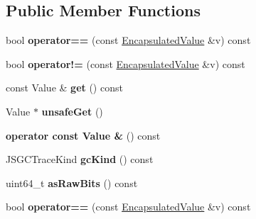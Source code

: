\subsection*{Public Member Functions}
\begin{DoxyCompactItemize}
\item 
\hypertarget{classjs_1_1_encapsulated_value_a4b9b38d4ba8bc8c614e6d15c3393bec4}{bool {\bfseries operator==} (const \hyperlink{classjs_1_1_encapsulated_value}{Encapsulated\-Value} \&v) const }\label{classjs_1_1_encapsulated_value_a4b9b38d4ba8bc8c614e6d15c3393bec4}

\item 
\hypertarget{classjs_1_1_encapsulated_value_a911b4d13d995b3463fc53bed18f33519}{bool {\bfseries operator!=} (const \hyperlink{classjs_1_1_encapsulated_value}{Encapsulated\-Value} \&v) const }\label{classjs_1_1_encapsulated_value_a911b4d13d995b3463fc53bed18f33519}

\item 
\hypertarget{classjs_1_1_encapsulated_value_af687e0595b7dc48d9c009bbb207ff139}{const Value \& {\bfseries get} () const }\label{classjs_1_1_encapsulated_value_af687e0595b7dc48d9c009bbb207ff139}

\item 
\hypertarget{classjs_1_1_encapsulated_value_aa4448256613deaa55970414093d213d9}{Value $\ast$ {\bfseries unsafe\-Get} ()}\label{classjs_1_1_encapsulated_value_aa4448256613deaa55970414093d213d9}

\item 
\hypertarget{classjs_1_1_encapsulated_value_a4bf89cf1db0edd8ae0b2cecfd60ad55c}{{\bfseries operator const Value \&} () const }\label{classjs_1_1_encapsulated_value_a4bf89cf1db0edd8ae0b2cecfd60ad55c}

\item 
\hypertarget{classjs_1_1_encapsulated_value_a1eb95571b62c8245afb744d47ab2b31e}{J\-S\-G\-C\-Trace\-Kind {\bfseries gc\-Kind} () const }\label{classjs_1_1_encapsulated_value_a1eb95571b62c8245afb744d47ab2b31e}

\item 
\hypertarget{classjs_1_1_encapsulated_value_abf1c0919b5d5deaed6ec11f381e1e611}{uint64\-\_\-t {\bfseries as\-Raw\-Bits} () const }\label{classjs_1_1_encapsulated_value_abf1c0919b5d5deaed6ec11f381e1e611}

\item 
\hypertarget{classjs_1_1_encapsulated_value_a4b9b38d4ba8bc8c614e6d15c3393bec4}{bool {\bfseries operator==} (const \hyperlink{classjs_1_1_encapsulated_value}{Encapsulated\-Value} \&v) const }\label{classjs_1_1_encapsulated_value_a4b9b38d4ba8bc8c614e6d15c3393bec4}


\end{DoxyCompactItemize}
